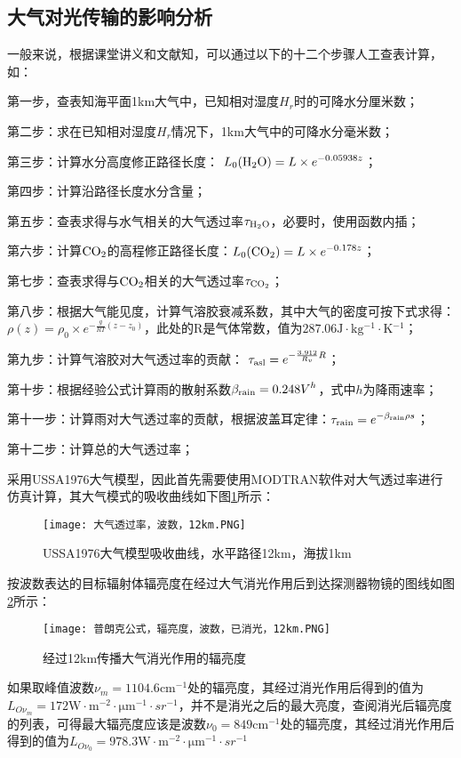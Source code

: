 \documentclass[11pt]{article}
\begin{document}
\subsection{大气对光传输的影响分析}
一般来说，根据课堂讲义\cite*{hand_up}和文献\cite*{optical_electrical_photography}知，可以通过以下的十二个步骤人工查表计算，如：\par
第一步，查表知海平面1\unit{\km}大气中，已知相对湿度$H_r$时的可降水分厘米数；\par
第二步：求在已知相对湿度$H_r$情况下，1km大气中的可降水分毫米数；\par
第三步：计算水分高度修正路径长度： $ \displaystyle L_0({\rm H_2O})  =L\times e^{-0.05938z} $；\par
第四步：计算沿路径长度水分含量；\par
第五步：查表求得与水气相关的大气透过率$\tau_{\rm H_2O}$，必要时，使用函数内插；\par
第六步：计算$\rm CO_2$的高程修正路径长度：$\displaystyle L_0({\rm CO_2})  =L\times e^{-0.178z}  $；\par
第七步：查表求得与$\rm CO_2$相关的大气透过率$\tau_{\rm CO_2}$；\par
第八步：根据大气能见度，计算气溶胶衰减系数，其中大气的密度可按下式求得：$\displaystyle\rho(z)  =\rho_0\times e^{-\frac{g}{RT}(z-z_0)} $，此处的R是气体常数，值为$287.06\unit{\J\cdot\kg^{-1}\cdot\K^{-1}}$；\par
第九步：计算气溶胶对大气透过率的贡献：
$\displaystyle\tau_{\rm asl}=e^{-\frac{3.912}{R_v}R}$；\par
第十步：根据经验公式计算雨的散射系数$\displaystyle\beta_{\rm rain}=0.248V^{h}$，式中$h$为降雨速率；\par
第十一步：计算雨对大气透过率的贡献，根据波盖耳定律：$\displaystyle\tau_{\rm rain} =e^{-\beta_{\rm rain}\rho s}$；\par
第十二步：计算总的大气透过率；\par
采用USSA1976大气模型，因此首先需要使用MODTRAN软件对大气透过率进行仿真计算，其大气模式的吸收曲线如下图\ref{fig:USSA1976大气模型吸收曲线，水平路径12km，海拔1km}所示：
\begin{figure}[H]
  \centering
  \texttt{[image: 大气透过率，波数，12km.PNG]}
  \caption{USSA1976大气模型吸收曲线，水平路径12km，海拔1km}
  \label{fig:USSA1976大气模型吸收曲线，水平路径12km，海拔1km}
\end{figure}
\par
按波数表达的目标辐射体辐亮度在经过大气消光作用后到达探测器物镜的图线如图\ref{fig:辐亮度，已消光，12km}所示：
\begin{figure}[H]
  \centering
  \texttt{[image: 普朗克公式，辐亮度，波数，已消光，12km.PNG]}
  \caption{经过12km传播大气消光作用的辐亮度}
  \label{fig:辐亮度，已消光，12km}
\end{figure}
\par
如果取峰值波数$\nu_m=1104.6\unit{\cm^{-1}}$处的辐亮度，其经过消光作用后得到的值为$L_{O\nu_m}=172\unit{\W\cdot \m^{-2}\cdot \um^{-1}\cdot sr^{-1}}$，并不是消光之后的最大亮度，查阅消光后辐亮度的列表，可得最大辐亮度应该是波数$\nu_0=849\unit{\cm^{-1}}$处的辐亮度，其经过消光作用后得到的值为$L_{O\nu_0}=978.3\unit{\W\cdot \m^{-2}\cdot \um^{-1}\cdot sr^{-1}}$
\end{document}
